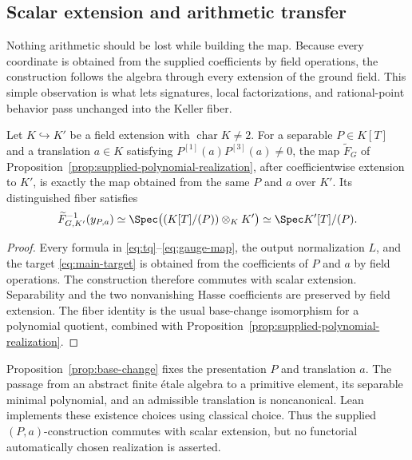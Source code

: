 \subsection{Scalar extension and arithmetic transfer}
\label{sec:realization}

Nothing arithmetic should be lost while building the map.  Because every
coordinate is obtained from the supplied coefficients by field operations,
the construction follows the algebra through every extension of the ground
field.  This simple observation is what lets signatures, local
factorizations, and rational-point behavior pass unchanged into the Keller
fiber.

\begin{proposition}
\label{prop:base-change}
Let \(K\hookrightarrow K'\) be a field extension with
\(\operatorname{char}K\neq2\).  For a separable \(P\in K[T]\) and a
translation \(a\in K\) satisfying
\(P^{[1]}(a)P^{[3]}(a)\neq0\), the map \(\widetilde F_G\) of
Proposition~\ref{prop:supplied-polynomial-realization}, after coefficientwise
extension to
\(K'\), is exactly the map obtained from the same \(P\) and \(a\) over
\(K'\).  Its distinguished fiber satisfies
\[
 \widetilde F_{G,K'}^{-1}(y_{P,a})
 \simeq
 \Spec\bigl((K[T]/(P))\otimes_KK'\bigr)
 \simeq
 \Spec K'[T]/(P).
\]
\end{proposition}

\begin{proof}
Every formula in \eqref{eq:tq}--\eqref{eq:gauge-map}, the output
normalization \(L\), and the target \eqref{eq:main-target} is obtained from
the coefficients of \(P\) and \(a\) by field operations.  The construction
therefore commutes with scalar extension.  Separability and the two
nonvanishing Hasse coefficients are preserved by field extension.  The
fiber identity is the usual base-change isomorphism for a polynomial
quotient, combined with
Proposition~\ref{prop:supplied-polynomial-realization}.
\end{proof}

\begin{remark}\label{rem:base-change-choice}
Proposition~\ref{prop:base-change} fixes the presentation \(P\) and
translation \(a\).  The passage from an abstract finite \'etale algebra to a
primitive element, its separable minimal polynomial, and an admissible
translation is noncanonical.  Lean implements these existence choices using
classical choice.  Thus the supplied \((P,a)\)-construction commutes with
scalar extension, but no functorial automatically chosen realization is
asserted.
\end{remark}

